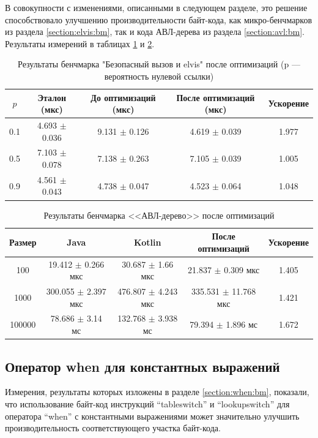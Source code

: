 В совокупности с изменениями, описанными в следующем разделе, это решение способствовало улучшению
производительности байт-кода, как микро-бенчмарков из раздела \ref{section:elvis:bm}, так и кода
АВЛ-дерева из раздела \ref{section:avl:bm}.
Результаты измерений в таблицах \ref{bm:elvis:o} и \ref{bm:stars:o}.

\begin{table}[h]
\begin{center}
\begin{tabular}{|c|c|c|c|c|} \hline
$p$ & Эталон (мкс) & До оптимизаций (мкс) & После оптимизаций (мкс) & Ускорение \\ \hline
0.1 & 4.693 $\pm$ 0.036 & 9.131 $\pm$ 0.126 & 4.619 $\pm$ 0.039 & 1.977\\ \hline
0.5 & 7.103 $\pm$ 0.078 & 7.138 $\pm$ 0.263 & 7.105 $\pm$ 0.039 & 1.005\\ \hline
0.9 & 4.561 $\pm$ 0.043 & 4.738 $\pm$ 0.047 & 4.523 $\pm$ 0.064 & 1.048\\ \hline
\end{tabular}
\caption{Результаты бенчмарка "Безопасный вызов и elvis" после оптимизаций \newline (p --- вероятность нулевой ссылки)}
\label{bm:elvis:o}
\end{center}
\end{table}

\begin{table}[h]
\begin{center}
\begin{tabular}{|c|c|c|c|c|} \hline
Размер & Java & Kotlin & После оптимизаций & Ускорение \\ \hline
100 & 19.412 $\pm$ 0.266 мкс & 30.687 $\pm$ 1.66 мкс & 21.837 $\pm$ 0.309 мкс & 1.405\\ \hline
1000 & 300.055 $\pm$ 2.397 мкс & 476.807 $\pm$ 4.243 мкс & 335.531 $\pm$ 11.768 мкс & 1.421\\ \hline
100000 & 78.686 $\pm$ 3.14 мс & 132.768 $\pm$ 3.938 мс & 79.394 $\pm$ 1.896 мс & 1.672\\ \hline
\end{tabular}
\caption{Результаты бенчмарка <<АВЛ-дерево>> после оптимизаций}
\label{bm:stars:o}
\end{center}
\end{table}

\subsection{Оператор when для константных выражений}
Измерения, результаты которых изложены в разделе \ref{section:when:bm}, показали, что использование
байт-код инструкций ``tableswitch'' и ``lookupswitch'' для оператора ``when'' с константными
выражениями может значительно улучшить производительность соответствующего участка байт-кода.

